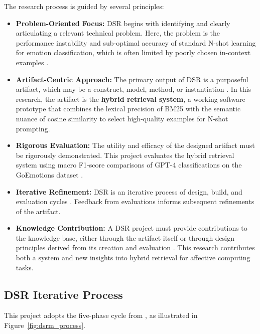 The research process is guided by several principles:

\begin{itemize}
    \item \textbf{Problem-Oriented Focus:} DSR begins with identifying and clearly articulating a relevant technical problem. Here, the problem is the performance instability and sub-optimal accuracy of standard N-shot learning for emotion classification, which is often limited by poorly chosen in-context examples \cite{zhao2021calibrate}.
    \item \textbf{Artifact-Centric Approach:} The primary output of DSR is a purposeful artifact, which may be a construct, model, method, or instantiation \cite{hevner2004design}. In this research, the artifact is the \textbf{hybrid retrieval system}, a working software prototype that combines the lexical precision of BM25 with the semantic nuance of cosine similarity to select high-quality examples for N-shot prompting.
    \item \textbf{Rigorous Evaluation:} The utility and efficacy of the designed artifact must be rigorously demonstrated. This project evaluates the hybrid retrieval system using macro F1-score comparisons of GPT-4 classifications on the GoEmotions dataset \cite{demszky2020goemotions}.
    \item \textbf{Iterative Refinement:} DSR is an iterative process of design, build, and evaluation cycles \cite{peffers2007dsr}. Feedback from evaluations informs subsequent refinements of the artifact.
    \item \textbf{Knowledge Contribution:} A DSR project must provide contributions to the knowledge base, either through the artifact itself or through design principles derived from its creation and evaluation \cite{gregor2013positioning}. This research contributes both a system and new insights into hybrid retrieval for affective computing tasks.
\end{itemize}

\subsection{DSR Iterative Process}
This project adopts the five-phase cycle from \cite{peffers2007dsr}, as illustrated in Figure~\ref{fig:dsrm_process}.

